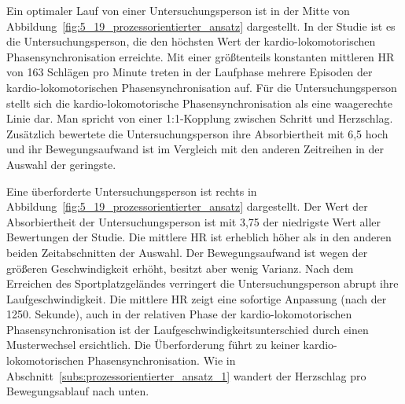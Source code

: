\begin{sidewaysfigure}
	\resizebox{1.00\textwidth}{!}{%
		
		}%
	\caption[Prozessdarstellung im Verlauf des Laufess (Studie: Laufen)]{Prozessdarstellung im Verlauf des Laufens -- Drei Minuten Daten einer Untersuchungsperson, die sich unterfordert hat (links), einer Untersuchungsperson, die ihr optimales Tempo gefunden hat (mitte) und einer Untersuchungsperson, die sich überfordert hat (rechts). Quelle: Eigene Darstellung \\ \hspace{\textwidth}\emph{Anmerkung}: Bew. = Bewegungsaufwand \\ \hspace{\textwidth}Rel. Phase = Relative Phase}
	\label{fig:5_19_prozessorientierter_ansatz}
\end{sidewaysfigure}

Ein optimaler Lauf von einer Untersuchungsperson ist in der Mitte von Abbildung~\ref{fig:5_19_prozessorientierter_ansatz} dargestellt. In der Studie ist es die Untersuchungsperson, die den höchsten Wert der kardio-lokomotorischen Phasensynchronisation erreichte. Mit einer größtenteils konstanten mittleren \ac{HR} von 163 Schlägen pro Minute treten in der Laufphase mehrere Episoden der kardio-lokomotorischen Phasensynchronisation auf. Für die Untersuchungsperson stellt sich die kardio-lokomotorische Phasensynchronisation als eine waagerechte Linie dar. Man spricht von einer 1:1-Kopplung zwischen Schritt und Herzschlag. Zusätzlich bewertete die Untersuchungsperson ihre Absorbiertheit mit 6,5 hoch und ihr Bewegungsaufwand ist im Vergleich mit den anderen Zeitreihen in der Auswahl der geringste. 

Eine überforderte Untersuchungsperson ist rechts in Abbildung~\ref{fig:5_19_prozessorientierter_ansatz} dargestellt. Der Wert der Absorbiertheit der Untersuchungsperson ist mit 3,75 der niedrigste Wert aller Bewertungen der Studie. Die mittlere \ac{HR} ist erheblich höher als in den anderen beiden Zeitabschnitten der Auswahl. Der Bewegungsaufwand ist wegen der größeren Geschwindigkeit erhöht, besitzt aber wenig Varianz. Nach dem Erreichen des Sportplatzgeländes verringert die Untersuchungsperson abrupt ihre Laufgeschwindigkeit. Die mittlere \ac{HR} zeigt eine sofortige Anpassung (nach der 1250. Sekunde), auch in der relativen Phase der kardio-lokomotorischen Phasensynchronisation ist der Laufgeschwindigkeitsunterschied durch einen Musterwechsel ersichtlich. Die Überforderung führt zu keiner kardio-lokomotorischen Phasensynchronisation. Wie in Abschnitt~\ref{subs:prozessorientierter_ansatz_1} wandert der Herzschlag pro Bewegungsablauf nach unten.

